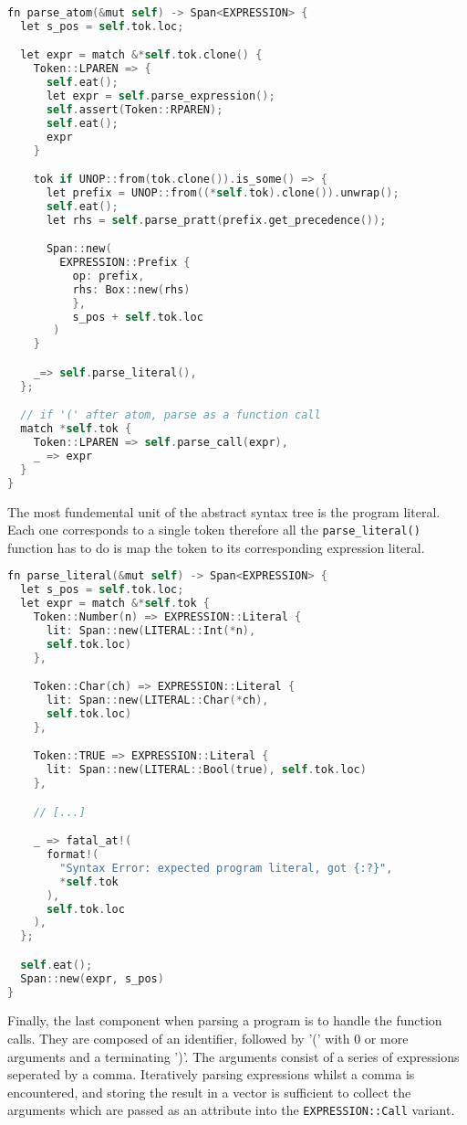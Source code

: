 \begin{lstlisting}[language=C]
fn parse_atom(&mut self) -> Span<EXPRESSION> {
  let s_pos = self.tok.loc;

  let expr = match &*self.tok.clone() {
    Token::LPAREN => {
      self.eat();
      let expr = self.parse_expression();
      self.assert(Token::RPAREN);
      self.eat();
      expr
    }

    tok if UNOP::from(tok.clone()).is_some() => {
      let prefix = UNOP::from((*self.tok).clone()).unwrap();
      self.eat();
      let rhs = self.parse_pratt(prefix.get_precedence());

      Span::new(
        EXPRESSION::Prefix { 
          op: prefix, 
          rhs: Box::new(rhs) 
          }, 
          s_pos + self.tok.loc
       )
    }

    _=> self.parse_literal(),
  };

  // if '(' after atom, parse as a function call
  match *self.tok {
    Token::LPAREN => self.parse_call(expr),
    _ => expr
  }
}
\end{lstlisting}

The most fundemental unit of the abstract syntax tree is the program literal. Each one corresponds to a single token therefore all the \texttt{parse\_literal()} function has to do is map the token to its corresponding expression literal. 

\begin{lstlisting}[language=C]
fn parse_literal(&mut self) -> Span<EXPRESSION> {
  let s_pos = self.tok.loc;
  let expr = match &*self.tok {
    Token::Number(n) => EXPRESSION::Literal { 
      lit: Span::new(LITERAL::Int(*n), 
      self.tok.loc) 
    },

    Token::Char(ch) => EXPRESSION::Literal { 
      lit: Span::new(LITERAL::Char(*ch), 
      self.tok.loc) 
    },

    Token::TRUE => EXPRESSION::Literal { 
      lit: Span::new(LITERAL::Bool(true), self.tok.loc) 
    },

    // [...]

    _ => fatal_at!(
      format!(
        "Syntax Error: expected program literal, got {:?}",
        *self.tok
      ),
      self.tok.loc
    ),
  };

  self.eat();
  Span::new(expr, s_pos)
}
\end{lstlisting}

Finally, the last component when parsing a program is to handle the function calls. They are composed of an identifier, followed by  '(' with 0 or more arguments and a terminating ')'. The arguments consist of a series of expressions seperated by a comma.  Iteratively parsing expressions whilst a comma is encountered, and storing the result in a vector is sufficient to collect the arguments which are passed as an attribute into the \texttt{EXPRESSION::Call} variant. 

